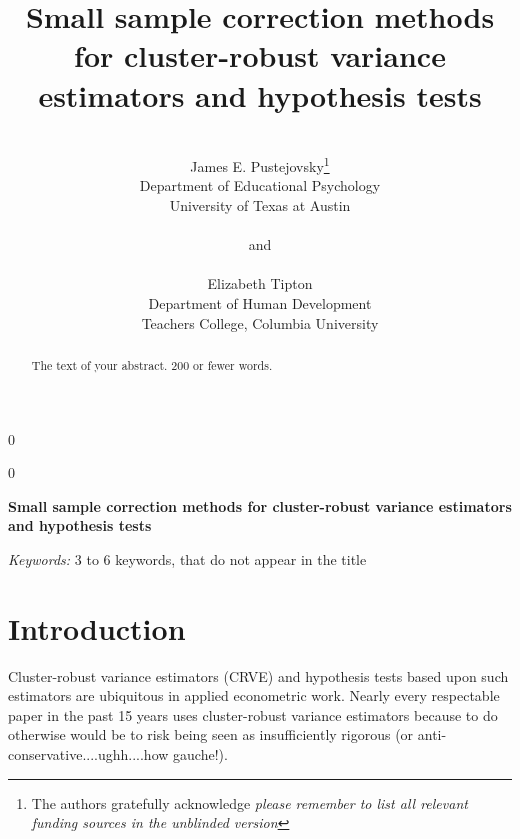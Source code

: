\documentclass[12pt]{article}\usepackage[]{graphicx}\usepackage[]{color}
\newcommand{\blind}{0}
\begin{document}
\def\spacingset#1{\renewcommand{\baselinestretch}%
{#1}\small\normalsize} \spacingset{1}



\blind
{
  \title{\bf Small sample correction methods for cluster-robust variance estimators and hypothesis tests}
  \author{\\James E. Pustejovsky\thanks{
    The authors gratefully acknowledge \textit{please remember to list all relevant funding sources in the unblinded version}}\hspace{.2cm}\\
    Department of Educational Psychology \\ 
    University of Texas at Austin\\ \\
    and \\ \\
    Elizabeth Tipton \\
    Department of Human Development \\ 
    Teachers College, Columbia University}
  \maketitle
} \fi

\blind
{
  \bigskip
  \bigskip
  \bigskip
  \begin{center}
    {\LARGE\bf Small sample correction methods for cluster-robust variance estimators and hypothesis tests}
\end{center}
  \medskip
} \fi

\bigskip
\begin{abstract}
The text of your abstract.  200 or fewer words.
\end{abstract}

\noindent%
{\it Keywords:}  3 to 6 keywords, that do not appear in the title
\vfill

\newpage
\spacingset{1.45} %

\section{Introduction}
\label{sec:intro}



Cluster-robust variance estimators (CRVE) and hypothesis tests based upon such estimators are ubiquitous in applied econometric work. Nearly every respectable paper in the past 15 years uses cluster-robust variance estimators because to do otherwise would be to risk being seen as insufficiently rigorous (or anti-conservative....ughh....how gauche!).
\end{document}

